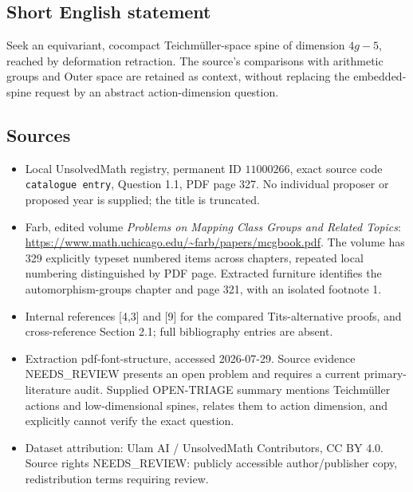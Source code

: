 \documentclass[11pt]{article}
\begin{document}
\subsection{Short English statement}
Seek an equivariant, cocompact Teichmüller-space spine of dimension \(4g-5\), reached by deformation retraction. The source's comparisons with arithmetic groups and Outer space are retained as context, without replacing the embedded-spine request by an abstract action-dimension question.
\subsection{Sources}
\begin{itemize}
\item Local UnsolvedMath registry, permanent ID \(11000266\), exact source code \texttt{catalogue entry}, Question 1.1, PDF page 327. No individual proposer or proposed year is supplied; the title is truncated.
\item Farb, edited volume \emph{Problems on Mapping Class Groups and Related Topics}: \url{https://www.math.uchicago.edu/~farb/papers/mcgbook.pdf}. The volume has 329 explicitly typeset numbered items across chapters, repeated local numbering distinguished by PDF page. Extracted furniture identifies the automorphism-groups chapter and page 321, with an isolated footnote 1.
\item Internal references [4,3] and [9] for the compared Tits-alternative proofs, and cross-reference Section 2.1; full bibliography entries are absent.
\item Extraction pdf-font-structure, accessed 2026-07-29. Source evidence NEEDS\_REVIEW presents an open problem and requires a current primary-literature audit. Supplied OPEN-TRIAGE summary mentions Teichmüller actions and low-dimensional spines, relates them to action dimension, and explicitly cannot verify the exact question.
\item Dataset attribution: Ulam AI / UnsolvedMath Contributors, CC BY 4.0. Source rights NEEDS\_REVIEW: publicly accessible author/publisher copy, redistribution terms requiring review.
\end{itemize}
\end{document}
